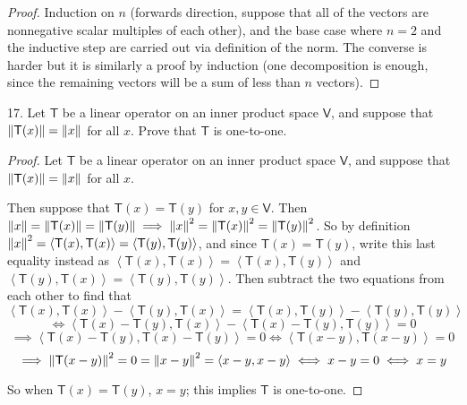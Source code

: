 \documentclass[11pt]{article}
\newcommand{\abr}[1]{\left\langle#1\right\rangle}
\begin{document}
\begin{proof}
  Induction on $n$ (forwards direction, suppose that all of the vectors are nonnegative scalar multiples of each other), and the base case where $n=2$ and the inductive step are carried out via definition of the norm. The converse is harder but it is similarly a proof by induction (one decomposition is enough, since the remaining vectors will be a sum of less than $n$ vectors).
\end{proof}

17. Let $\mathsf{T}$ be a linear operator on an inner product space $\mathsf{V}$, and suppose that $\norm{\mathsf{T}(x)} = \norm{x}$ for all $x$. Prove that $\mathsf{T}$ is one-to-one.

\begin{proof}
  Let $\mathsf{T}$ be a linear operator on an inner product space $\mathsf{V}$, and suppose that $\norm{\mathsf{T}(x)} = \norm{x}$ for all $x$.

  Then suppose that $\mathsf{T}(x) = \mathsf{T}(y)$ for $x,y\in\mathsf{V}$. Then $\norm{x} = \norm{\mathsf{T}(x)} = \norm{\mathsf{T}(y)} \implies \norm{x}^2 = \norm{\mathsf{T}(x)}^2 = \norm{\mathsf{T}(y)}^2$. So by definition $\norm{x}^2 = \abr{\mathsf{T}(x), \mathsf{T}(x)} = \abr{\mathsf{T}(y), \mathsf{T}(y)}$, and since $\mathsf{T}(x) = \mathsf{T}(y)$, write this last equality instead as $\abr{\mathsf{T}(x), \mathsf{T}(x)} = \abr{\mathsf{T}(x), \mathsf{T}(y)}$ and $\abr{\mathsf{T}(y), \mathsf{T}(x)} = \abr{\mathsf{T}(y), \mathsf{T}(y)}$. Then subtract the two equations from each other to find that $$\abr{\mathsf{T}(x), \mathsf{T}(x)} - \abr{\mathsf{T}(y), \mathsf{T}(x)} = \abr{\mathsf{T}(x), \mathsf{T}(y)} - \abr{\mathsf{T}(y), \mathsf{T}(y)}$$ $$\iff \abr{\mathsf{T}(x)-\mathsf{T}(y), \mathsf{T}(x)} - \abr{\mathsf{T}(x)-\mathsf{T}(y), \mathsf{T}(y)} = 0 $$ $$\implies \abr{\mathsf{T}(x)-\mathsf{T}(y), \mathsf{T}(x)-\mathsf{T}(y)} = 0 \iff \abr{\mathsf{T}(x-y), \mathsf{T}(x-y)} = 0$$ $$\implies \norm{\mathsf{T}(x-y)}^2 = 0 = \norm{x-y}^2 = \abr{x-y,x-y} \iff x-y = 0 \iff x=y$$

  So when $\mathsf{T}(x) = \mathsf{T}(y)$, $x=y$; this implies $\mathsf{T}$ is one-to-one.  
\end{proof}
\end{document}
